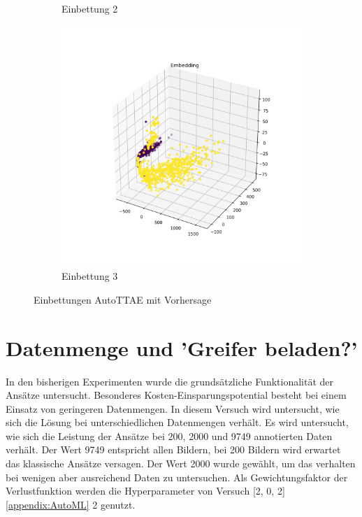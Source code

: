\begin{figure}[h]
\begin{subfigure}[c]{0.32\textwidth}
			\caption{Einbettung 2}
			\label{img:AutoMLEinbettungV2}	
		\end{subfigure}
		\begin{subfigure}[c]{0.32\textwidth}			
			\includegraphics[width=1\textwidth, center]{src/AutoML/3/Embedding.png}
			\caption{Einbettung 3}
			\label{img:AutoMLEinbettungV3}	
		\end{subfigure}
		\caption{Einbettungen AutoTTAE mit Vorhersage}
		\label{img:EmbeddingAutoMLTransfer}
	\end{figure}
	
	\section{Datenmenge und 'Greifer beladen?'}
	\label{sec:TransferDatenmenge}
	In den bisherigen Experimenten wurde die grundsätzliche Funktionalität der Ansätze untersucht. Besonderes  Kosten-Einsparungspotential besteht bei einem Einsatz von geringeren Datenmengen. In diesem Versuch wird untersucht, wie sich die Lösung bei unterschiedlichen Datenmengen verhält. Es wird untersucht, wie sich die Leistung der Ansätze bei 200, 2000 und 9749 annotierten Daten verhält. Der Wert 9749 entspricht allen Bildern, bei 200 Bildern wird erwartet das klassische Ansätze versagen. Der Wert 2000 wurde gewählt, um das verhalten bei wenigen aber ausreichend Daten zu untersuchen. Als Gewichtungsfaktor der Verlustfunktion werden die Hyperparameter von Versuch [2, 0, 2] \ref{appendix:AutoML} 2 genutzt. 
	
